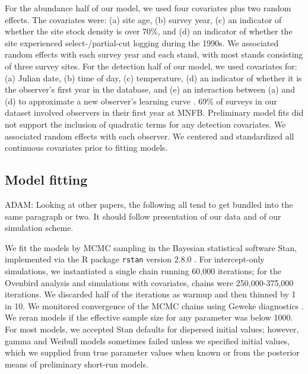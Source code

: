 \documentclass[useAMS,usenatbib,referee,12pt]{article}
\newcommand{\adam}[1]{{\color{blue} ADAM: #1}}
\begin{document}
For the abundance half of our model, we used four covariates plus two random effects.  
The covariates were: (a) site age, (b) survey year, (c) an indicator of whether the site stock density is over 70\%, and (d) an indicator of whether the site experienced select-/partial-cut logging during the 1990s.  
We associated random effects with each survey year and each stand, with most stands consisting of three survey sites.  
For the detection half of our model, we used covariates for: (a) Julian date, (b) time of day, (c) temperature, (d) an indicator of whether it is the observer's first year in the database, and (e) an interaction between (a) and (d) to approximate a new observer's learning curve \citep{Alldredge2007}.  
69\% of surveys in our dataset involved observers in their first year at MNFB.  
Preliminary model fits did not support the inclusion of quadratic terms for any detection covariates.  
We associated random effects with each observer.  
We centered and standardized all continuous covariates prior to fitting models.






\subsection{Model fitting}\adam{Looking at other papers, the following all tend to get bundled into the same paragraph or two.  It should follow presentation of our data and of our simulation scheme.}

We fit the models by MCMC sampling in the Bayesian statistical software Stan, implemented via the R package \texttt{rstan} version 2.8.0 \citep{Rstan2015}.  
For intercept-only simulations, we instantiated a single chain running 60,000 iterations; for the Ovenbird analysis and simulations with covariates, chains were 250,000-375,000 iterations.  
We discarded half of the iterations as warmup and then thinned by 1 in 10.  
We monitored convergence of the MCMC chains using Geweke diagnostics \citep{Geweke1991}.  
We reran models if the effective sample size for any parameter was below 1000.  
For most models, we accepted Stan defaults for dispersed initial values; however, gamma and Weibull models sometimes failed unless we specified initial values, which we supplied from true parameter values when known or from the posterior means of preliminary short-run models.
\end{document}
